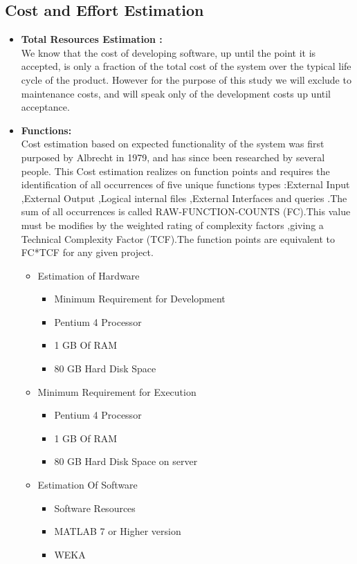 \documentclass[a4paper,14pt,onecolumn]{article}
\begin{document}
\subsection{Cost and Effort Estimation}
\begin{itemize}
\item \textbf{Total Resources Estimation :}\\
   We know that the cost of developing software, up until the point it is accepted, is only a fraction of the total cost of the system over the typical life cycle of the product. However for the purpose of this study we will exclude to maintenance costs, and will speak only of the development costs up until acceptance.
\item \textbf{Functions:}\\
Cost estimation based on expected functionality of the system was first purposed by Albrecht in 1979, and has since been researched by several people. This Cost estimation realizes on function points and requires the identification of all occurrences of five unique functions types :External  Input ,External  Output  ,Logical internal files ,External Interfaces and queries .The sum of all occurrences is called RAW-FUNCTION-COUNTS (FC).This value must be modifies by the weighted rating of complexity factors ,giving a Technical Complexity Factor (TCF).The function points are equivalent to FC*TCF  for any given project. 
   \begin{itemize}
   \item Estimation of Hardware
           \begin{itemize}
           \item Minimum Requirement for Development
            \item Pentium 4 Processor
            \item 1 GB Of RAM
            \item 80 GB Hard Disk Space
            \end{itemize}
   \item Minimum Requirement for Execution
            \begin{itemize}
            \item Pentium 4 Processor
            \item 1 GB Of RAM
            \item 80 GB Hard Disk Space on server
           \end{itemize}
   \item Estimation Of  Software
            \begin{itemize}
            \item Software Resources
            \item MATLAB 7 or Higher version
            \item 	WEKA
            \end{itemize}
  \end{itemize}
\end{itemize}
\end{document}
